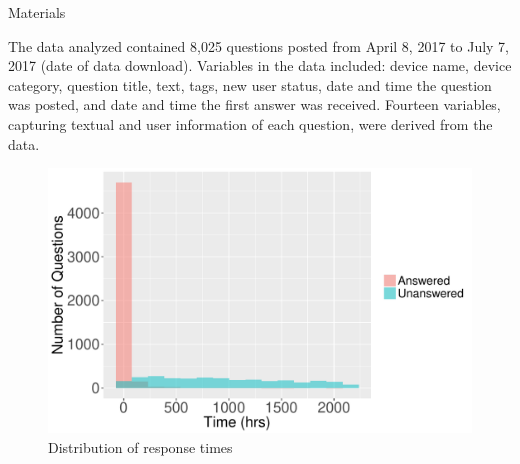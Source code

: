 \documentclass[final]{beamer}
\newlength{\onecolwid}
\begin{document}
\begin{frame}[t]
\begin{columns}[t]
\begin{column}{\onecolwid}
\begin{block}{Materials}

The data analyzed contained 8,025 questions posted from April 8, 2017 to July 7, 2017 (date of data download). Variables in the data included: device name, device category, question title, text, tags, new user status, date and time the question was posted, and date and time the first answer was received. Fourteen variables, capturing textual and user information of each question, were derived from the data.


% 
% 
% 
% 
% 
% 
% 
% 
% 
% 
% 
% 
% 



\end{block}


\begin{figure}
\includegraphics[width=1\linewidth]{FIG1.pdf}
\caption{Distribution of response times}
\label{fig1}
\end{figure}


\end{column}
\end{columns}
\end{frame}
\end{document}
